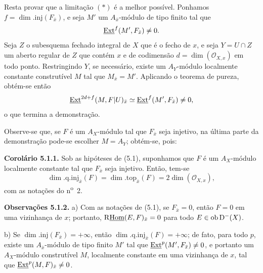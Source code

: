 Resta provar que a limitação $(*)$ é a melhor possível. Ponhamos $f=\dim.\mathrm{inj}(F_{\bar{x}})$, e seja $M'$ um $A_{\bar{x}}$-módulo de tipo finito tal que
\[
        \underline{\operatorname{Ext}}^f(M',F_{\bar{x}})\neq0.
\]
Seja $Z$ o subesquema fechado integral de $X$ que é o fecho de $x$, e seja $Y=U\cap Z$ um aberto regular de $Z$ que contém $x$ e de codimensão $d=\dim(\mathcal{O}_{X,x})$ em todo ponto. Restringindo $Y$, se necessário, existe um $A_Y$-módulo localmente constante construtível $M$ tal que $M_{\bar{x}}=M'$. Aplicando o teorema de pureza, obtém-se então
\[
        \underline{\operatorname{Ext}}^{2d+f}(M,F|U)_{\bar{x}}\simeq \underline{\operatorname{Ext}}^f(M',F_{\bar{x}})\neq0,
\]
o que termina a demonstração.

Observe-se que, se $F$ é um $A_X$-módulo tal que $F_{\bar{x}}$ seja injetivo, na última parte da demonstração pode-se escolher $M=A_Y$; obtém-se, pois:

\textbf{Corolário 5.1.1.} Sob as hipóteses de (5.1), suponhamos que $F$ é um $A_X$-módulo localmente constante tal que $F_{\bar{x}}$ seja injetivo. Então, tem-se
\[
        \dim.\mathrm{q.inj}_{\bar{x}}(F)=\dim.\mathrm{top}_{\bar{x}}(F)=2\dim(\mathcal{O}_{X,x}),
\]
com as notações do n\textsuperscript{o}~2.

\textbf{Observações 5.1.2.} a) Com as notações de (5.1), se $F_{\bar{x}}=0$, então $F=0$ em uma vizinhança de $x$; portanto, $\mathrm{R}\underline{\operatorname{Hom}}(E,F)_{\bar{x}}=0$ para todo $E\in\operatorname{ob}\mathrm{D}^{-}(X)$.

b) Se $\dim.\mathrm{inj}(F_{\bar{x}})=+\infty$, então $\dim.\mathrm{q.inj}_{\bar{x}}(F)=+\infty$; de fato, para todo $p$, existe um $A_{\bar{x}}$-módulo de tipo finito $M'$ tal que $\underline{\operatorname{Ext}}^p(M',F_{\bar{x}})\neq0$, e portanto um $A_X$-módulo construtível $M$, localmente constante em uma vizinhança de $x$, tal que $\underline{\operatorname{Ext}}^p(M,F)_{\bar{x}}\neq0$.
